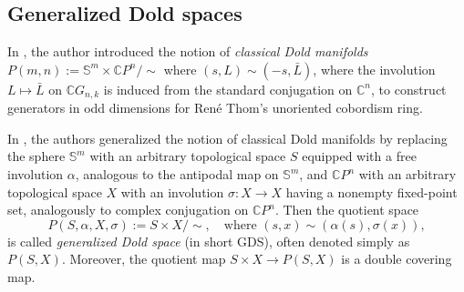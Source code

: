 \documentclass{amsart}
\begin{document}
	\subsection{Generalized Dold spaces}  \label{gen dold}
	In \cite{dold}, the author introduced the notion %
of \textit{classical Dold manifolds}  
	$P(m,n) := \mathbb{S}^m \times \mathbb{C}P^n / \!\! \sim$  
	where $ (s, L) \sim (-s, \bar{L}) $, where the involution $L\mapsto\bar L$ on $\mathbb CG_{n,k}$ is induced from the standard conjugation on $\mathbb C^n$, to %
construct generators in odd dimensions for René Thom's unoriented cobordism ring. %
	
	In \cite{nath-sankaran, mandal-sankaran}, the authors generalized the notion of classical Dold manifolds by replacing the sphere $ \mathbb{S}^m $ with an arbitrary topological space $ S $ equipped with a free involution $ \alpha $, analogous to the antipodal map on $ \mathbb{S}^m $, and $ \mathbb CP^n $ with an arbitrary topological space $ X $ with an involution $ \sigma: X \to X $ having a nonempty fixed-point set, analogously to complex conjugation on $\mathbb CP^n$. Then the quotient space  
	\begin{equation}\label{gen dold space}
		P(S, \alpha, X, \sigma) := S \times X / \!\! \sim, \quad \text{where } (s, x) \sim (\alpha(s), \sigma(x)), 
	\end{equation}  
	is called \textit{generalized Dold space} (in short GDS), often denoted simply as $ P(S, X) $. Moreover, the quotient map  
	$ S \times X \to P(S,X) $  
	is a double covering map. %
	
\end{document}

